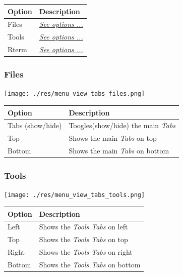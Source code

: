 \begin{scriptsize}
  \begin{tabularx}{\textwidth}{>{\hsize=0.3\hsize}X>{\hsize=0.7\hsize}X}\\
    \hline
    \textbf{Option} & \textbf{Description} \\
    \hline
    Files & \textit{\href{\#menu\_view\_tabs\_files}{See options ...}} \\
    Tools & \textit{\href{\#menu\_view\_tabs\_tools}{See options ...}} \\
    Rterm & \textit{\href{\#menu\_view\_tabs\_rterm}{See options ...}} \\
    \hline
  \end{tabularx}
\end{scriptsize}


\hypertarget{menu_view_tabs_files}{}
\subsubsection{Files}

\texttt{[image: ./res/menu\_view\_tabs\_files.png]}\\

\begin{scriptsize}
  \begin{tabularx}{\textwidth}{>{\hsize=0.3\hsize}X>{\hsize=0.7\hsize}X}\\
    \hline
    \textbf{Option} & \textbf{Description} \\
    \hline
    Tabs (show/hide) & Toogles(show/hide) the main \textit{Tabs} \\
    Top & Shows the main \textit{Tabs} on top \\
    Bottom & Shows the main \textit{Tabs} on bottom \\
    \hline
  \end{tabularx}
\end{scriptsize}


\hypertarget{menu_view_tabs_tools}{}
\subsubsection{Tools}

\texttt{[image: ./res/menu\_view\_tabs\_tools.png]}\\

\begin{scriptsize}
  \begin{tabularx}{\textwidth}{>{\hsize=0.3\hsize}X>{\hsize=0.7\hsize}X}\\
    \hline
    \textbf{Option} & \textbf{Description} \\
    \hline
    Left & Shows the \textit{Tools Tabs} on left \\
    Top & Shows the \textit{Tools Tabs} on top \\
    Right & Shows the \textit{Tools Tabs} on right \\
    Bottom & Shows the \textit{Tools Tabs} on bottom \\
    \hline
  \end{tabularx}
\end{scriptsize}


